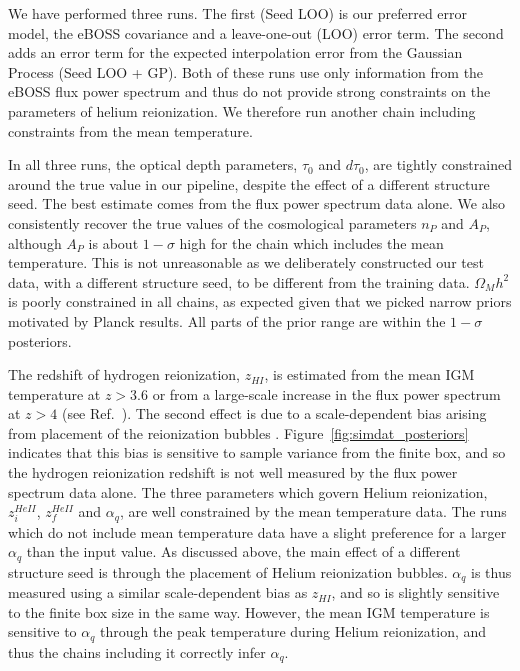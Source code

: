 We have performed three runs. The first (Seed LOO) is our preferred error model, the eBOSS covariance and a leave-one-out (LOO) error term. The second adds an error term for the expected interpolation error from the Gaussian Process (Seed LOO + GP). Both of these runs use only information from the eBOSS flux power spectrum and thus do not provide strong constraints on the parameters of helium reionization. We therefore run another chain including constraints from the mean temperature.

In all three runs, the optical depth parameters, $\tau_0$ and $d\tau_0$, are tightly constrained around the true value in our pipeline, despite the effect of a different structure seed. The best estimate comes from the flux power spectrum data alone. We also consistently recover the true values of the cosmological parameters $n_P$ and $A_P$, although $A_P$ is about $1-\sigma$ high for the chain which includes the mean temperature. This is not unreasonable as we deliberately constructed our test data, with a different structure seed, to be different from the training data. $\Omega_M h^2$ is poorly constrained in all chains, as expected given that we picked narrow priors motivated by Planck results. All parts of the prior range are within the $1-\sigma$ posteriors.

The redshift of hydrogen reionization, $z_{HI}$, is estimated from the mean IGM temperature at $z > 3.6$ or from a large-scale increase in the flux power spectrum at $z > 4$ (see Ref.~\cite{2023simsuite}). The second effect is due to a scale-dependent bias arising from placement of the reionization bubbles \cite{Montero:2019}. Figure~\ref{fig:simdat_posteriors} indicates that this bias is sensitive to sample variance from the finite box, and so the hydrogen reionization redshift is not well measured by the flux power spectrum data alone.
The three parameters which govern Helium reionization, $z_i^{HeII}$, $z_f^{HeII}$ and $\alpha_q$, are well constrained by the mean temperature data. The runs which do not include mean temperature data have a slight preference for a larger $\alpha_q$ than the input value. As discussed above, the main effect of a different structure seed is through the placement of Helium reionization bubbles. $\alpha_q$ is thus measured using a similar scale-dependent bias as $z_{HI}$, and so is slightly sensitive to the finite box size in the same way. However, the mean IGM temperature is sensitive to $\alpha_q$ through the peak temperature during Helium reionization, and thus the chains including it correctly infer $\alpha_q$.

